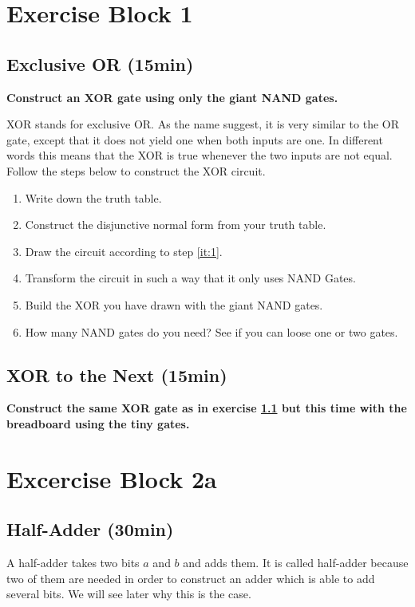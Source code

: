 
\section{Exercise Block 1}

\subsection{Exclusive OR (15min)}\label{subsec:ex-1}
\textbf{Construct an XOR gate using only the giant NAND gates.}

 XOR stands for exclusive OR. As the name suggest, it is very similar to the OR gate, except that it does not yield one when both inputs are one. In different words this means that the XOR is true whenever the two inputs are not equal. Follow the steps below to construct the XOR circuit.
\begin{enumerate}
	\item Write down the truth table.
	\item\label{it:1} Construct the disjunctive normal form from your truth table.
	\item Draw the circuit according to step \ref{it:1}.
	\item Transform the circuit in such a way that it only uses NAND Gates.
	\item Build the XOR you have drawn with the giant NAND gates.
	\item How many NAND gates do you need? See if you can loose one or two gates.
\end{enumerate}

\subsection{XOR to the Next (15min)}
\textbf{Construct the same XOR gate as in exercise \ref{subsec:ex-1} but this time with the breadboard using the tiny gates.}


\section{Excercise Block 2a}

\subsection{Half-Adder (30min)}

A half-adder takes two bits $a$ and $b$ and adds them. It is called half-adder because two of them are needed in order to construct an adder which is able to add several bits. We will see later why this is the case.

